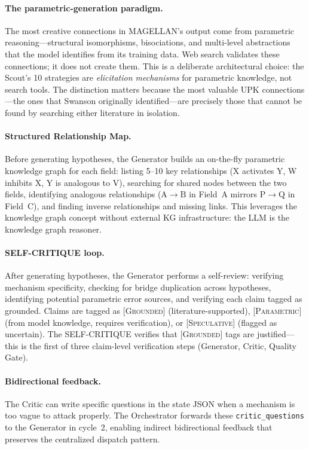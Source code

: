 \paragraph{The parametric-generation paradigm.} The most creative connections in MAGELLAN's output come from parametric reasoning---structural isomorphisms, bisociations, and multi-level abstractions that the model identifies from its training data. Web search validates these connections; it does not create them. This is a deliberate architectural choice: the Scout's 10 strategies are \emph{elicitation mechanisms} for parametric knowledge, not search tools. The distinction matters because the most valuable UPK connections---the ones that Swanson originally identified---are precisely those that cannot be found by searching either literature in isolation.

\paragraph{Structured Relationship Map.} Before generating hypotheses, the Generator builds an on-the-fly parametric knowledge graph for each field: listing 5--10 key relationships (X activates Y, W inhibits X, Y is analogous to V), searching for shared nodes between the two fields, identifying analogous relationships ($\mathrm{A} \to \mathrm{B}$ in Field~A mirrors $\mathrm{P} \to \mathrm{Q}$ in Field~C), and finding inverse relationships and missing links. This leverages the knowledge graph concept without external KG infrastructure: the LLM is the knowledge graph reasoner.

\paragraph{SELF-CRITIQUE loop.} After generating hypotheses, the Generator performs a self-review: verifying mechanism specificity, checking for bridge duplication across hypotheses, identifying potential parametric error sources, and verifying each claim tagged as grounded. Claims are tagged as \textsc{[Grounded]} (literature-supported), \textsc{[Parametric]} (from model knowledge, requires verification), or \textsc{[Speculative]} (flagged as uncertain). The SELF-CRITIQUE verifies that \textsc{[Grounded]} tags are justified---this is the first of three claim-level verification steps (Generator, Critic, Quality Gate).

\paragraph{Bidirectional feedback.} The Critic can write specific questions in the state JSON when a mechanism is too vague to attack properly. The Orchestrator forwards these \texttt{critic\_questions} to the Generator in cycle~2, enabling indirect bidirectional feedback that preserves the centralized dispatch pattern.

